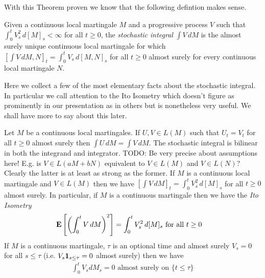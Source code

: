 With this Theorem proven we know that the following defintion makes sense.
\begin{defn}Given a continuous local martingale $M$ and a progressive process $V$ such that $\int_0^t V^2_s \, d[M]_s < \infty$ for all $t \geq 0$, the \emph{stochastic integral} $\int V \, dM$ is the almost surely unique continuous local martingale for which $[\int V \, dM, N]_t = \int_0^t V_s \, d[M,N]_s$ for all $t \geq 0$ almost surely for every continuous local martingale $N$.
\end{defn}

Here we collect a few of the most elementary facts about the stochastic integral.  In particular we call attention to the Ito Isometry which doesn't figure as prominently in our presentation as in others but is nonetheless very useful.  We shall have more to say about this later.  
\begin{lem}\label{BasicPropertiesStochasticIntegralContinuousMartingale}Let $M$ be a continuous local martingales.  If $U,V \in L(M)$ such that $U_t=V_t$ for all $t \geq 0$ almost surely then $\int U \, dM = \int V \, dM$.  The stochastic integral is bilinear in both the integrand and integrator.
TODO: Be very precise about assumptions here!  E.g. is $V \in L(aM + bN)$ equivalent to $V \in L(M)$ and $V \in L(N)$?  Clearly the latter is at least as strong as the former.
If $M$ is a continuous local martingale and $V \in L(M)$ then we have $[\int V \, dM]_t = \int_0^t V^2_s \, d[M]_s$ for all $t \geq 0$ almost surely.  In particular, if $M$ is a continuous martingale then we have the \emph{Ito Isometry} 
\begin{align*}
\textbf{E}\left[\left(\int_0^t V \, dM\right)^2\right] &= \int_0^t V_s^2 \, d[M]_s \text{ for all $t \geq 0$}
\end{align*}
If $M$ is a continuous martingale, $\tau$ is an optional time and almost surely $V_s = 0$ for all $s \leq \tau$ (i.e. $V_s \textbf{1}_{s \leq \tau} = 0$ almost surely) then we have
\begin{align*}
\int_0^t V_s dM_s = 0 \text{ almost surely on $\lbrace t \leq \tau\rbrace$}
\end{align*}
\end{lem}
